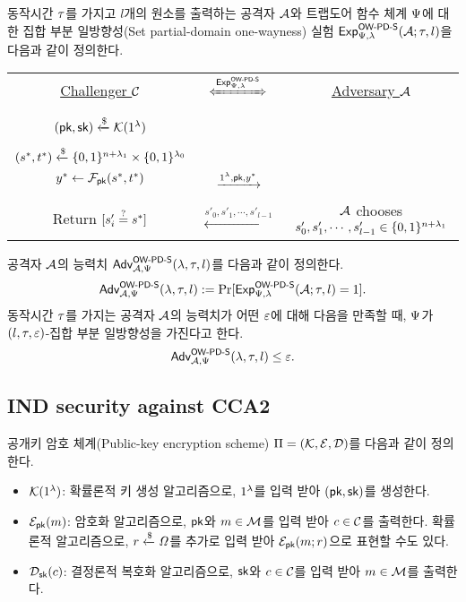 \documentclass{article}
\theoremstyle{definition}
\begin{document}
동작시간 $\rt$를 가지고 $l$개의 원소를 출력하는 공격자 $\adv$와 트랩도어 함수
체계 $\tdsch$에 대한 집합 부분 일방향성(Set partial-domain one-wayness) 실험
$\Exp^{\owpds}_{\tdsch, \sp}(\adv; \rt, l)$을 다음과 같이 정의한다.
\begin{tcolorbox}[colback=white]
	\centering
	\begin{tabularx}{\linewidth}{CcC}
		\underline{Challenger $\ch$} & $\xLeftrightarrow{\Exp^{\owpds}_{\tdsch, \sp}}$ & \underline{Adversary $\adv$} \\
		\\
		$(\pk, \sk) \rgets \genkey(1^{\sp})$ & & \\
		\\
		$(s^*, t^*) \rgets \set{0, 1}^{\mlen + \sp_1} \times \set{0, 1}^{\sp_0}$ \\ $y^* \gets \td_{\pk}(s^*, t^*)$ & $\xrightarrow{1^{\sp}, \pk, y^*}$ & \\
		\\
		Return $[s'_i \same s^*]$ & $\xleftarrow{s'_0, s'_1, \cdots, s'_{l-1}}$ & $\adv$ chooses $s'_0, s'_1, \cdots, s'_{l-1} \in \set{0, 1}^{\mlen + \sp_1}$ \\
  \end{tabularx}
\end{tcolorbox}

공격자 $\adv$의 능력치 $\Adv^{\owpds}_{\adv, \tdsch}(\sp, \rt, l)$를 다음과 같이 정의한다.
$$
	\Adv^{\owpds}_{\adv, \tdsch}(\sp, \rt, l) := \Pr[\Exp^{\owpds}_{\tdsch, \sp}(\adv; \rt, l) = 1].
$$
동작시간 $\rt$를 가지는 공격자 $\adv$의 능력치가 어떤 $\negl$에 대해 다음을
만족할 때, $\tdsch$가 $(l, \rt, \negl)$-집합 부분 일방향성을 가진다고 한다.
$$
	\Adv^{\owpds}_{\adv, \tdsch}(\sp, \rt, l) \le \negl.
$$

\subsection{IND security against CCA2}

공개키 암호
체계(Public-key encryption scheme) $\sch = (\genkey, \enc, \dec)$를 다음과 같이
정의한다.
\begin{itemize}
	\item $\genkey(1^{\sp})$: 확률론적 키 생성 알고리즘으로, $1^{\sp}$를 입력
	받아 $(\pk, \sk)$를 생성한다.
	\item $\enc_{\pk}(\msg)$: 암호화 알고리즘으로, $\pk$와 $\msg \in
	\msgspace$를 입력 받아 $\ct \in \ctspace$를 출력한다. 확률론적 알고리즘으로,
	$\coin \rgets \coinspace$를 추가로 입력 받아 $\enc_{\pk}(\msg; \coin)$으로
	표현할 수도 있다.
	\item $\dec_{\sk}(\ct)$: 결정론적 복호화 알고리즘으로, $\sk$와 $\ct \in
	\ctspace$를 입력 받아 $\msg \in \msgspace$를 출력한다.
\end{itemize}
\end{document}
